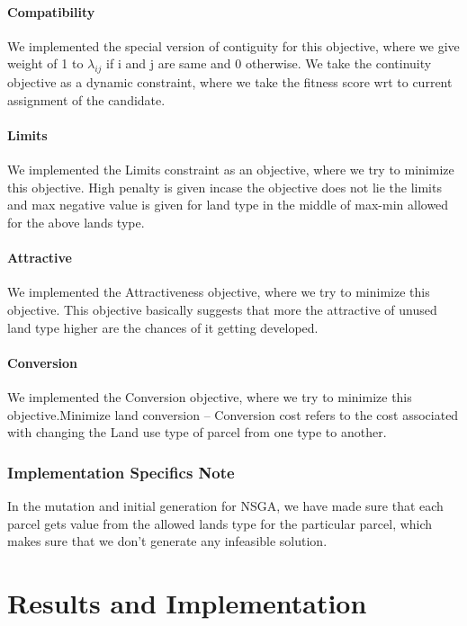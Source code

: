 \documentclass[twoside,10pt]{article}
\begin{document}
\paragraph*{Compatibility}

We implemented the special version of contiguity for this objective, where we give weight of 1 to $\lambda_{ij}$ if i and j are same and 0 otherwise.
We  take the continuity objective as a dynamic constraint, where we take the fitness score wrt to current assignment of the candidate. 

\paragraph*{Limits}

We implemented the Limits constraint as an  objective, where we try to minimize this objective. High penalty is given incase the objective does not lie the limits and max negative value is given for land type in the middle of max-min allowed for the above lands type. 

\paragraph*{Attractive}

We implemented the Attractiveness  objective, where we try to minimize this objective. This objective basically suggests that more the attractive of unused land type higher are the chances of it getting developed.

\paragraph*{Conversion}

We implemented the Conversion  objective, where we try to minimize this objective.Minimize land conversion -- Conversion cost refers to the cost associated with changing the Land use type of parcel from one type to another.

\subsubsection*{Implementation Specifics Note}

In the mutation and initial generation for NSGA, we have made sure that each parcel gets value from the allowed lands type for the particular parcel, which makes sure that we don't generate any infeasible solution.
\section{Results and Implementation }
\end{document}

